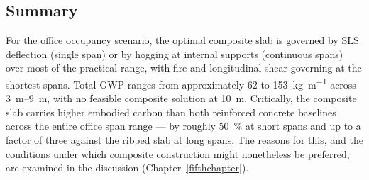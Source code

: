 \subsection{Summary}
\label{sec:res_summary_office}
For the office occupancy scenario, the optimal composite slab is governed by SLS deflection (single span) or by hogging at internal supports (continuous spans) over most of the practical range, with fire and longitudinal shear governing at the shortest spans. Total GWP ranges from approximately \SI{62}{} to \SI{153}{\kilo\gram\per\meter} across \SIrange{3}{9}{\meter}, with no feasible composite solution at \SI{10}{\meter}. Critically, the composite slab carries higher embodied carbon than both reinforced concrete baselines across the entire office span range --- by roughly \SI{50}{\percent} at short spans and up to a factor of three against the ribbed slab at long spans. The reasons for this, and the conditions under which composite construction might nonetheless be preferred, are examined in the discussion (Chapter~\ref{fifthchapter}).
